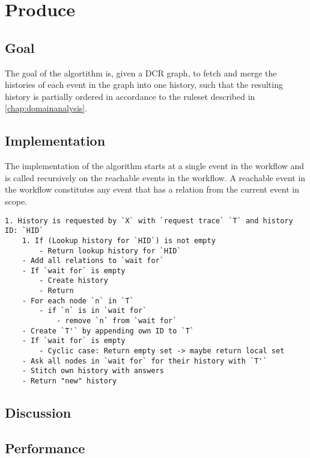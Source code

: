 \section{Produce}
\subsection{Goal} %
The goal of the algortithm is, given a DCR graph, to fetch and merge the histories of each event in the graph into one history, such that the resulting history is partially ordered in accordance to the ruleset described in \autoref{chap:domainanalysis}. 


\subsection{Implementation} %
The implementation of the algorithm starts at a single event in the workflow and is called recursively on the reachable events in the workflow. A reachable event in the workflow constitutes any event that has a relation from the current event in scope. 


\begin{lstlisting}[breaklines=true]
 1. History is requested by `X` with `request trace` `T` and history ID: `HID`
    1. If (Lookup history for `HID`) is not empty
        - Return lookup history for `HID`
    - Add all relations to `wait for`
    - If `wait for` is empty
        - Create history
        - Return
    - For each node `n` in `T`
        - if `n` is in `wait for`
            - remove `n` from `wait for`
    - Create `T'` by appending own ID to `T`
    - If `wait for` is empty
        - Cyclic case: Return empty set -> maybe return local set
    - Ask all nodes in `wait for` for their history with `T'`
    - Stitch own history with answers
    - Return "new" history
\end{lstlisting}

\subsection{Discussion} %
\subsection{Performance} %